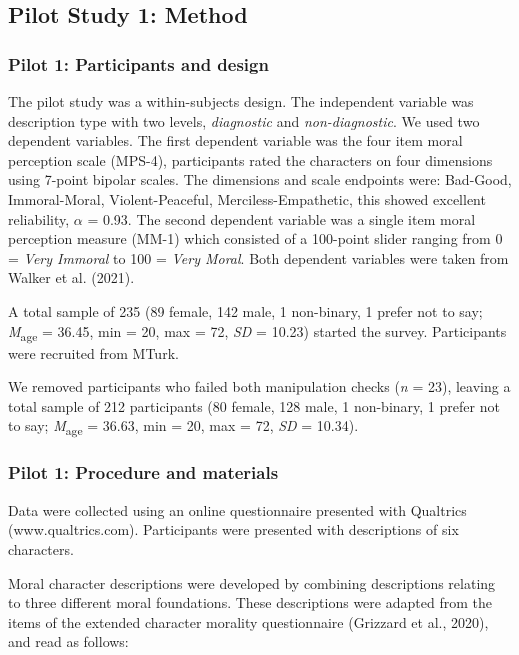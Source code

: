 \documentclass[
  man,floatsintext]{apa6}
\begin{document}
\subsection{Pilot Study 1: Method}\label{pilot-study-1-method}

\subsubsection{Pilot 1: Participants and design}\label{pilot-1-participants-and-design}

The pilot study was a within-subjects design. The independent variable was description type with two levels, \emph{diagnostic} and \emph{non-diagnostic}. We used two dependent variables. The first dependent variable was the four item moral perception scale (MPS-4), participants rated the characters on four dimensions using 7-point bipolar scales. The dimensions and scale endpoints were: Bad-Good, Immoral-Moral, Violent-Peaceful, Merciless-Empathetic, this showed excellent reliability, \(\alpha\) = 0.93. The second dependent variable was a single item moral perception measure (MM-1) which consisted of a 100-point slider ranging from 0 = \emph{Very Immoral} to 100 = \emph{Very Moral}. Both dependent variables were taken from Walker et al. (2021).

A total sample of 235 (89 female, 142 male, 1 non-binary, 1 prefer not to say; \emph{M}\textsubscript{age} = 36.45, min = 20, max = 72, \emph{SD} = 10.23) started the survey. Participants were recruited from MTurk.

We removed participants who failed both manipulation checks (\emph{n} = 23), leaving a total sample of 212 participants (80 female, 128 male, 1 non-binary, 1 prefer not to say; \emph{M}\textsubscript{age} = 36.63, min = 20, max = 72, \emph{SD} = 10.34).

\subsubsection{Pilot 1: Procedure and materials}\label{pilot-1-procedure-and-materials}

Data were collected using an online questionnaire presented with Qualtrics (www.qualtrics.com). Participants were presented with descriptions of six characters.

Moral character descriptions were developed by combining descriptions relating to three different moral foundations. These descriptions were adapted from the items of the extended character morality questionnaire (Grizzard et al., 2020), and read as follows:
\end{document}
